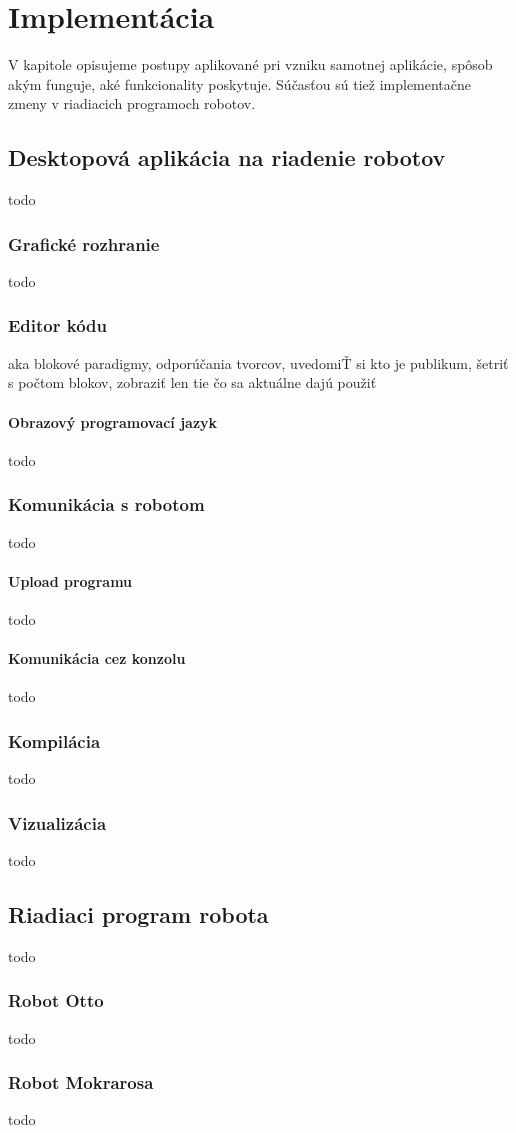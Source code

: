 \chapter{Implementácia}

\label{kap:implementacia}

V kapitole opisujeme postupy aplikované pri vzniku samotnej aplikácie, spôsob akým funguje, aké funkcionality poskytuje. Súčasťou sú tiež implementačne zmeny v riadiacich programoch robotov.

\section{Desktopová aplikácia na riadenie robotov}
todo

\subsection{Grafické rozhranie}
todo

\subsection{Editor kódu}
aka blokové paradigmy, odporúčania tvorcov, uvedomiŤ si kto je publikum, šetriť s počtom blokov, zobraziť len tie čo sa aktuálne dajú použiť

\subsubsection{Obrazový programovací jazyk}
todo

\subsection{Komunikácia s robotom}
todo

\subsubsection{Upload programu}
todo

\subsubsection{Komunikácia cez konzolu}
todo

\subsection{Kompilácia}
todo

\subsection{Vizualizácia}
todo

\section{Riadiaci program robota}
todo

\subsection{Robot Otto}
todo

\subsection{Robot Mokrarosa}
todo
